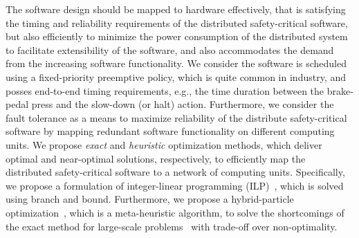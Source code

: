 The software design should be mapped to hardware effectively, that is satisfying the timing and reliability requirements of the distributed safety-critical software, but also efficiently to minimize the power consumption of the distributed system to facilitate extensibility of the software, and also accommodates the demand from the increasing software functionality. We consider the software is scheduled using a fixed-priority preemptive policy, which is quite common in industry, and posses end-to-end timing requirements, e.g., the time duration between the brake-pedal press and the slow-down (or halt) action. Furthermore,  we consider the fault tolerance as a means to maximize reliability of the distribute safety-critical software by mapping redundant software functionality on different computing units.  We propose  \textit{exact} and \textit{heuristic} optimization methods, which deliver optimal and near-optimal solutions, respectively, to efficiently map the distributed safety-critical software to a network of computing units. Specifically, we propose a formulation of integer-linear programming (ILP)~\cite{Mahmud5222}, which is solved using branch and bound. Furthermore, we propose a hybrid-particle optimization~\cite{Mirjalili2019ParticleOptimisation}, which is a meta-heuristic algorithm, to solve the shortcomings of the exact method for large-scale problems~\cite{Mahmud2019Power-awareOptimization} with trade-off over non-optimality.

